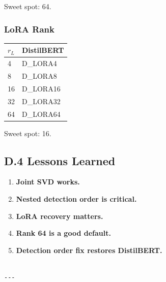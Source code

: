 Sweet spot: 64.

\subsubsection{LoRA Rank}

\begin{table}[H]
\centering
\small
\begin{tabular}{ll}
\toprule
\textbf{$r_L$} & \textbf{DistilBERT} \\
\midrule
4 & {{D\_LORA4}} \\
8 & {{D\_LORA8}} \\
16 & {{D\_LORA16}} \\
32 & {{D\_LORA32}} \\
64 & {{D\_LORA64}} \\
\bottomrule
\end{tabular}
\end{table}

Sweet spot: 16.

\subsection{D.4 Lessons Learned}

\begin{enumerate}
\item \textbf{Joint SVD works.}
\item \textbf{Nested detection order is critical.}
\item \textbf{LoRA recovery matters.}
\item \textbf{Rank 64 is a good default.}
\item \textbf{Detection order fix restores DistilBERT.}
\end{enumerate}
\begin{lstlisting}

---
\end{lstlisting}